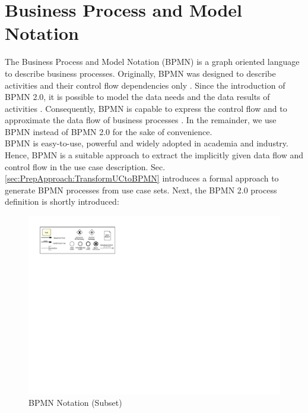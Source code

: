 \section{Business Process and Model Notation}
\label{sec:PrepApproach:BPMN}
The Business Process and Model Notation (BPMN) is a graph oriented language to describe business processes. Originally, BPMN was designed to describe activities and their control flow dependencies only \cite{VisualizeBPMN}. Since the introduction of BPMN 2.0, it is possible to model the data needs and the data results of activities \cite{OMG}. Consequently, BPMN is capable to express the control flow and to approximate the data flow of business processes \cite{DataFlowErrorBPMN}. In the remainder, we use BPMN instead of BPMN 2.0 for the sake of convenience. \\
BPMN is easy-to-use, powerful and widely adopted in academia and industry. Hence, BPMN is a suitable approach to extract the implicitly given data flow and control flow in the use case description. Sec.\ref{sec:PrepApproach:TransformUCtoBPMN} introduces a formal approach to generate BPMN processes from use case sets. Next, the BPMN 2.0 process definition is shortly introduced:


\begin{figure}[h!]
	\includegraphics[width=\textwidth, trim={1cm 16.5cm 19.2cm 1cm}]{img/Overview.pdf}
	\caption{BPMN Notation (Subset)}
	\label{fig:BPMNSubset}
\end{figure}

